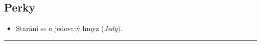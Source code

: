 \documentclass[11pt,a4paper]{article}
\begin{document}
\begin{twosidecolumns}
\begin{multicols}{2}
      \section*{Perky}
      \begin{itemize}
        \item Starání se o jedovatý hmyz ({\it Jedy}).
      \end{itemize}
    \end{multicols}

    \hrule\medskip
    
  \end{twosidecolumns}
\end{document}
